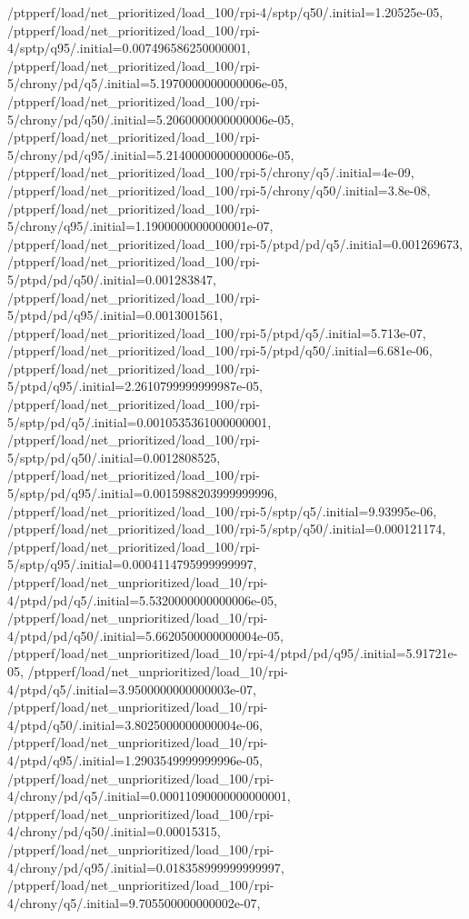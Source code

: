 {    /ptpperf/load/net_prioritized/load_100/rpi-4/sptp/q50/.initial=1.20525e-05,
    /ptpperf/load/net_prioritized/load_100/rpi-4/sptp/q95/.initial=0.007496586250000001,
    /ptpperf/load/net_prioritized/load_100/rpi-5/chrony/pd/q5/.initial=5.1970000000000006e-05,
    /ptpperf/load/net_prioritized/load_100/rpi-5/chrony/pd/q50/.initial=5.2060000000000006e-05,
    /ptpperf/load/net_prioritized/load_100/rpi-5/chrony/pd/q95/.initial=5.2140000000000006e-05,
    /ptpperf/load/net_prioritized/load_100/rpi-5/chrony/q5/.initial=4e-09,
    /ptpperf/load/net_prioritized/load_100/rpi-5/chrony/q50/.initial=3.8e-08,
    /ptpperf/load/net_prioritized/load_100/rpi-5/chrony/q95/.initial=1.1900000000000001e-07,
    /ptpperf/load/net_prioritized/load_100/rpi-5/ptpd/pd/q5/.initial=0.001269673,
    /ptpperf/load/net_prioritized/load_100/rpi-5/ptpd/pd/q50/.initial=0.001283847,
    /ptpperf/load/net_prioritized/load_100/rpi-5/ptpd/pd/q95/.initial=0.0013001561,
    /ptpperf/load/net_prioritized/load_100/rpi-5/ptpd/q5/.initial=5.713e-07,
    /ptpperf/load/net_prioritized/load_100/rpi-5/ptpd/q50/.initial=6.681e-06,
    /ptpperf/load/net_prioritized/load_100/rpi-5/ptpd/q95/.initial=2.2610799999999987e-05,
    /ptpperf/load/net_prioritized/load_100/rpi-5/sptp/pd/q5/.initial=0.0010535361000000001,
    /ptpperf/load/net_prioritized/load_100/rpi-5/sptp/pd/q50/.initial=0.0012808525,
    /ptpperf/load/net_prioritized/load_100/rpi-5/sptp/pd/q95/.initial=0.0015988203999999996,
    /ptpperf/load/net_prioritized/load_100/rpi-5/sptp/q5/.initial=9.93995e-06,
    /ptpperf/load/net_prioritized/load_100/rpi-5/sptp/q50/.initial=0.000121174,
    /ptpperf/load/net_prioritized/load_100/rpi-5/sptp/q95/.initial=0.0004114795999999997,
    /ptpperf/load/net_unprioritized/load_10/rpi-4/ptpd/pd/q5/.initial=5.5320000000000006e-05,
    /ptpperf/load/net_unprioritized/load_10/rpi-4/ptpd/pd/q50/.initial=5.6620500000000004e-05,
    /ptpperf/load/net_unprioritized/load_10/rpi-4/ptpd/pd/q95/.initial=5.91721e-05,
    /ptpperf/load/net_unprioritized/load_10/rpi-4/ptpd/q5/.initial=3.9500000000000003e-07,
    /ptpperf/load/net_unprioritized/load_10/rpi-4/ptpd/q50/.initial=3.8025000000000004e-06,
    /ptpperf/load/net_unprioritized/load_10/rpi-4/ptpd/q95/.initial=1.2903549999999996e-05,
    /ptpperf/load/net_unprioritized/load_100/rpi-4/chrony/pd/q5/.initial=0.00011090000000000001,
    /ptpperf/load/net_unprioritized/load_100/rpi-4/chrony/pd/q50/.initial=0.00015315,
    /ptpperf/load/net_unprioritized/load_100/rpi-4/chrony/pd/q95/.initial=0.018358999999999997,
    /ptpperf/load/net_unprioritized/load_100/rpi-4/chrony/q5/.initial=9.705500000000002e-07,
}
